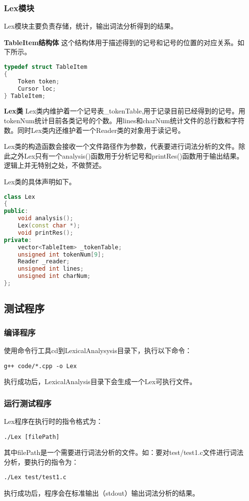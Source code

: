 \documentclass[twocolumn]{article}
\begin{document}
\subsubsection{Lex模块}
Lex模块主要负责存储，统计，输出词法分析得到的结果。

\textbf{TableItem结构体 }这个结构体用于描述得到的记号和记号的位置的对应关系。如下所示。
\begin{lstlisting}[language=C++]
typedef struct TableItem
{
    Token token;
    Cursor loc;
} TableItem;
\end{lstlisting}

\textbf{Lex类 }Lex类内维护着一个记号表\_tokenTable,用于记录目前已经得到的记号。用tokenNum统计目前各类记号的个数。用lines和charNum统计文件的总行数和字符数。同时Lex类内还维护着一个Reader类的对象用于读记号。

Lex类的构造函数会接收一个文件路径作为参数，代表要进行词法分析的文件。除此之外Lex只有一个analysis()函数用于分析记号和printRes()函数用于输出结果。逻辑上并无特别之处，不做赘述。

Lex类的具体声明如下。

\begin{lstlisting}[language=C++]
class Lex 
{
public:
    void analysis();
    Lex(const char *);
    void printRes();
private:
    vector<TableItem> _tokenTable;
    unsigned int tokenNum[9];
    Reader _reader;
    unsigned int lines;
    unsigned int charNum;
};
\end{lstlisting}



\subsection{测试程序}

\subsubsection{编译程序}

使用命令行工具cd到LexicalAnalysysis目录下，执行以下命令：
\begin{lstlisting}
g++ code/*.cpp -o Lex
\end{lstlisting}
执行成功后，LexicalAnalysis目录下会生成一个Lex可执行文件。

\subsubsection{运行测试程序}

Lex程序在执行时的指令格式为：
\begin{lstlisting}
./Lex [filePath]
\end{lstlisting}
其中filePath是一个需要进行词法分析的文件。如：要对test/test1.c文件进行词法分析，要执行的指令为：
\begin{lstlisting}
./Lex test/test1.c
\end{lstlisting}
执行成功后，程序会在标准输出（stdout）输出词法分析的结果。
\end{document}
